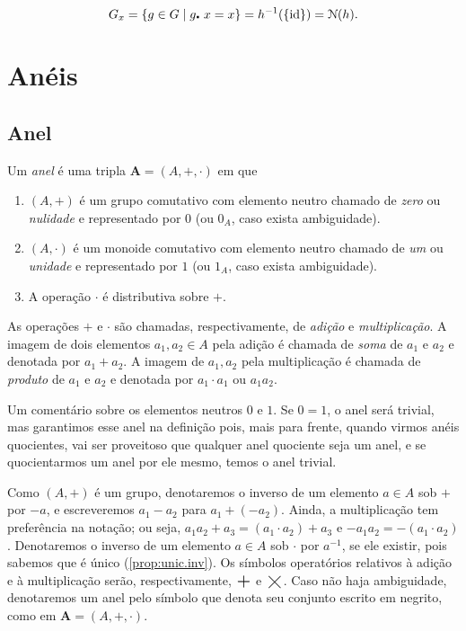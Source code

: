 \begin{equation*}
G_x = \left\{g \in G \;\middle\vert\; g\mathord{\centerdot}\  x = x \right\} = h^{-1}(\{\mathrm{id}\}) = \mathcal{N}(h).
\end{equation*}















\newpage

\chapter{Anéis}

\section{Anel}

\begin{defi}
	Um \emph{anel} é uma tripla $\bm A=(A,+,\cdot)$ em que
	\begin{enumerate}
	\item $(A,+)$ é um grupo comutativo com elemento neutro chamado de \emph{zero} ou \emph{nulidade} e representado por $0$ (ou $0_A$, caso exista ambiguidade).
	\item $(A,\cdot)$ é um monoide comutativo com elemento neutro chamado de \emph{um} ou \emph{unidade} e representado por $1$ (ou $1_A$, caso exista ambiguidade).
	\item A operação $\cdot$ é distributiva sobre $+$.
	\end{enumerate}
As operações $+$ e $\cdot$ são chamadas, respectivamente, de \emph{adição} e \emph{multiplicação}. A imagem de dois elementos $a_1,a_2 \in A$ pela adição é chamada de \emph{soma} de $a_1$ e $a_2$ e denotada por $a_1+a_2$. A imagem de $a_1,a_2$ pela multiplicação é chamada de \emph{produto} de $a_1$ e $a_2$ e denotada por $a_1 \cdot a_1$ ou $a_1a_2$.
\end{defi}

	Um comentário sobre os elementos neutros $0$ e $1$. Se $0=1$, o anel será trivial, mas garantimos esse anel na definição pois, mais para frente, quando virmos anéis quocientes, vai ser proveitoso que qualquer anel quociente seja um anel, e se quocientarmos um anel por ele mesmo, temos o anel trivial.

\begin{nota}
	Como $(A,+)$ é um grupo, denotaremos o inverso de um elemento $a \in A$ sob $+$ por $-a$, e escreveremos $a_1 - a_2$ para $a_1 + (-a_2)$. Ainda, a multiplicação tem preferência na notação; ou seja, $a_1a_2+a_3 = (a_1 \cdot a_2)+a_3$ e $-a_1a_2 = -(a_1 \cdot a_2)$. Denotaremos o inverso de um elemento $a \in A$ sob $\cdot$ por $a^{-1}$, se ele existir, pois sabemos que é único (\ref{prop:unic.inv}). Os símbolos operatórios relativos à adição e à multiplicação serão, respectivamente, $\bigplus$ e $\bigtimes$. Caso não haja ambiguidade, denotaremos um anel pelo símbolo que denota seu conjunto escrito em negrito, como em $\bm A=(A,+,\cdot)$.
\end{nota}

